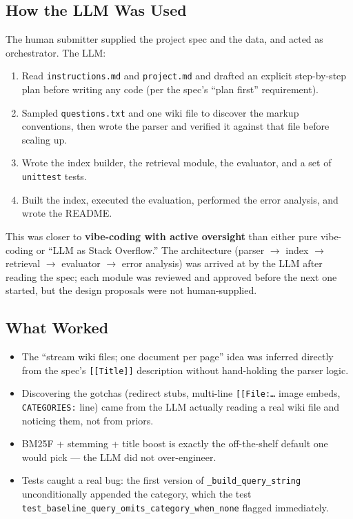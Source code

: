\documentclass[11pt]{article}
\begin{document}
\subsection{How the LLM Was Used}

The human submitter supplied the project spec and the data, and acted as
orchestrator. The LLM:

\begin{enumerate}
  \item Read \texttt{instructions.md} and \texttt{project.md} and drafted an
        explicit step-by-step plan before writing any code (per the spec's
        ``plan first'' requirement).
  \item Sampled \texttt{questions.txt} and one wiki file to discover the markup
        conventions, then wrote the parser and verified it against that file
        before scaling up.
  \item Wrote the index builder, the retrieval module, the evaluator, and a set
        of \texttt{unittest} tests.
  \item Built the index, executed the evaluation, performed the error analysis,
        and wrote the README.
\end{enumerate}

This was closer to \textbf{vibe-coding with active oversight} than either pure
vibe-coding or ``LLM as Stack Overflow.'' The architecture
(parser $\to$ index $\to$ retrieval $\to$ evaluator $\to$ error analysis) was
arrived at by the LLM after reading the spec; each module was reviewed and
approved before the next one started, but the design proposals were not
human-supplied.

\subsection{What Worked}

\begin{itemize}
  \item The ``stream wiki files; one document per page'' idea was inferred
        directly from the spec's \texttt{[[Title]]} description without
        hand-holding the parser logic.
  \item Discovering the gotchas (redirect stubs, multi-line
        \texttt{[[File:\ldots{}} image embeds, \texttt{CATEGORIES:} line) came
        from the LLM actually reading a real wiki file and noticing them, not
        from priors.
  \item BM25F + stemming + title boost is exactly the off-the-shelf default one
        would pick --- the LLM did not over-engineer.
  \item Tests caught a real bug: the first version of
        \texttt{\_build\_query\_string} unconditionally appended the category,
        which the test \texttt{test\_baseline\_query\_omits\_category\_when\_none}
        flagged immediately.
\end{itemize}
\end{document}
